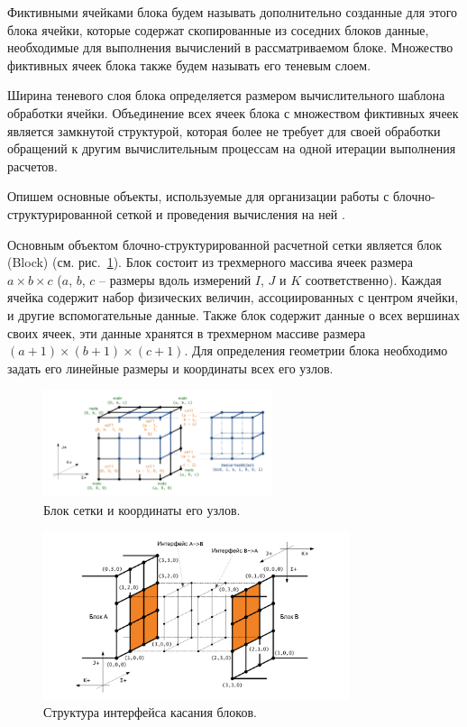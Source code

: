 \begin{definition}
Фиктивными ячейками блока будем называть дополнительно созданные для этого блока ячейки, которые содержат скопированные из соседних блоков данные, необходимые для выполнения вычислений в рассматриваемом блоке.
Множество фиктивных ячеек блока также будем называть его теневым слоем.
\end{definition}

Ширина теневого слоя блока определяется размером вычислительного шаблона обработки ячейки.
Объединение всех ячеек блока с множеством фиктивных ячеек является замкнутой структурой, которая более не требует для своей обработки обращений к другим вычислительным процессам на одной итерации выполнения расчетов.

Опишем основные объекты, используемые для организации работы с блочно-структурированной сеткой и проведения вычисления на ней \cite{CertRybakov2020PrepStruct}.

Основным объектом блочно-структурированной расчетной сетки является блок (Block) (см. рис.~\ref{fig:text_2_block_block_and_coords}). 
Блок состоит из трехмерного массива ячеек размера $a \times b \times c$ ($a$, $b$, $c$ -- размеры вдоль измерений $I$, $J$ и $K$ соответственно).
Каждая ячейка содержит набор физических величин, ассоциированных с центром ячейки, и другие вспомогательные данные.
Также блок содержит данные о всех вершинах своих ячеек, эти данные хранятся в трехмерном массиве размера $(a + 1) \times (b + 1) \times (c + 1)$.
Для определения геометрии блока необходимо задать его линейные размеры и координаты всех его узлов.

\begin{figure}[ht]
\centering
\includegraphics[width=0.6\textwidth]{fig/par_block_coords.pdf}
\singlespacing
{}\caption{Блок сетки и координаты его узлов.}
\label{fig:text_2_block_block_and_coords}
\end{figure}

\begin{figure}[ht]
\centering
\includegraphics[width=0.8\textwidth]{fig/par_7-iface.pdf}
\singlespacing
{}\caption{Структура интерфейса касания блоков.}
\label{fig:text_2_block_iface}
\end{figure}

